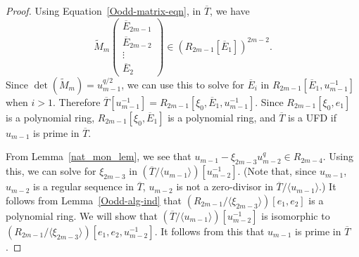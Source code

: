 \documentclass{amsart}
\begin{document}
\begin{proof}
Using Equation~\ref{Oodd-matrix-eqn}, in $\overline{T}$, we have
$$\widetilde{M}_m \begin{pmatrix} \overline{E}_{2m-1}\\ \overline{E}_{2m-2} \\ \vdots\\ \overline{E}_2 \end{pmatrix} \in \left(R_{2m-1}[\overline{E}_1]\right)^{2m-2}.$$
Since $\det(\widetilde{M}_m)=u_{m-1}^{q/2}$, we can use this to solve for $\overline{E}_i$ in $R_{2m-1}[\overline{E}_1,u_{m-1}^{-1}]$ when $i>1$.
Therefore $\overline{T}[u_{m-1}^{-1}]=R_{2m-1}[\xi_0,\overline{E}_1, u_{m-1}^{-1}]$.
Since $R_{2m-1}[\xi_0,e_1]$ is a polynomial ring, $R_{2m-1}[\xi_0,\overline{E}_1]$ is a polynomial ring, and $\overline{T}$ is a UFD if $u_{m-1}$ is prime in $\overline{T}$.

From Lemma~\ref{nat_mon_lem}, we see that $u_{m-1}-\xi_{2m-3}u_{m-2}^q\in R_{2m-4}$.
Using this, we can solve for $\xi_{2m-3}$ in $(\overline{T}/\langle u_{m-1}\rangle)[u_{m-2}^{-1}]$.
(Note that, since $u_{m-1}$, $u_{m-2}$ is a regular sequence in $\overline{T}$, $u_{m-2}$ is not a zero-divisor in $\overline{T}/\langle u_{m-1}\rangle$.)
It follows from Lemma~\ref{Oodd-alg-ind} that $(R_{2m-1}/\langle \xi_{2m-3}\rangle)[e_1,e_2]$ is a polynomial ring.
We will show that $(\overline{T}/\langle u_{m-1}\rangle)[u_{m-2}^{-1}]$ is isomorphic to $(R_{2m-1}/\langle \xi_{2m-3}\rangle)[e_1,e_2,u_{m-2}^{-1}]$.
It follows from this that $u_{m-1}$ is prime in $\overline{T}$. 


\end{proof}
\end{document}
